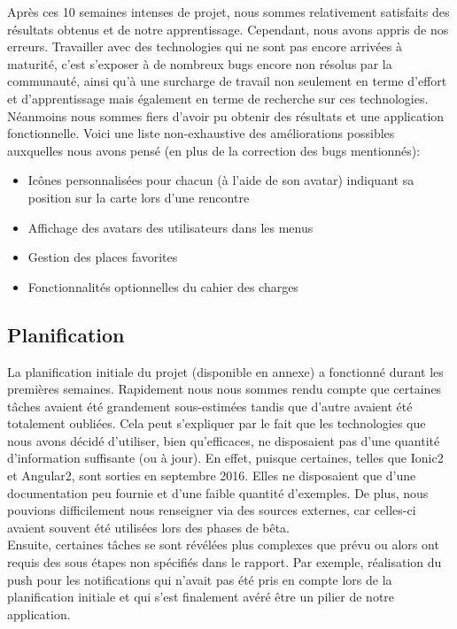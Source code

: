 \documentclass[french]{article}
\begin{document}
		
		Après ces 10 semaines intenses de projet, nous sommes relativement satisfaits des résultats obtenus et de notre apprentissage. Cependant, nous avons appris de nos erreurs. Travailler avec des technologies qui ne sont pas encore arrivées à maturité, c'est s'exposer à de nombreux bugs encore non résolus par la communauté, ainsi qu'à une surcharge de travail non seulement en terme d'effort et d'apprentissage mais également en terme de recherche sur ces technologies. Néanmoins nous sommes fiers d'avoir pu obtenir des résultats et une application fonctionnelle. Voici une liste non-exhaustive des améliorations possibles auxquelles nous avons pensé (en plus de la correction des bugs mentionnés):
		\begin{itemize}
			\item Icônes personnalisées pour chacun (à l'aide de son avatar) indiquant sa position sur la carte lors d'une rencontre
			\item Affichage des avatars des utilisateurs dans les menus
			\item Gestion des places favorites
			\item Fonctionnalités optionnelles du cahier des charges
		\end{itemize}
		
		\subsection{Planification}
		
		La planification initiale du projet (disponible en annexe) a fonctionné durant les premières semaines. Rapidement nous nous sommes rendu compte que certaines tâches avaient été grandement sous-estimées tandis que d'autre avaient été totalement oubliées.
		Cela peut s'expliquer par le fait que les technologies que nous avons décidé d'utiliser, bien qu'efficaces, ne disposaient pas d'une quantité d'information suffisante (ou à jour). En effet, puisque certaines, telles que Ionic2 et Angular2, sont sorties en septembre 2016. Elles ne disposaient que d'une documentation peu fournie et d'une faible quantité d'exemples. De plus, nous pouvions difficilement nous renseigner via des sources externes, car celles-ci avaient souvent été utilisées lors des phases de bêta. \\ 
		
		Ensuite, certaines tâches se sont révélées plus complexes que prévu ou alors ont requis des sous étapes non spécifiés dans le rapport. Par exemple, réalisation du push pour les notifications qui n'avait pas été pris en compte lors de la planification initiale et qui s'est finalement avéré être un pilier de notre application.
		
\end{document}
